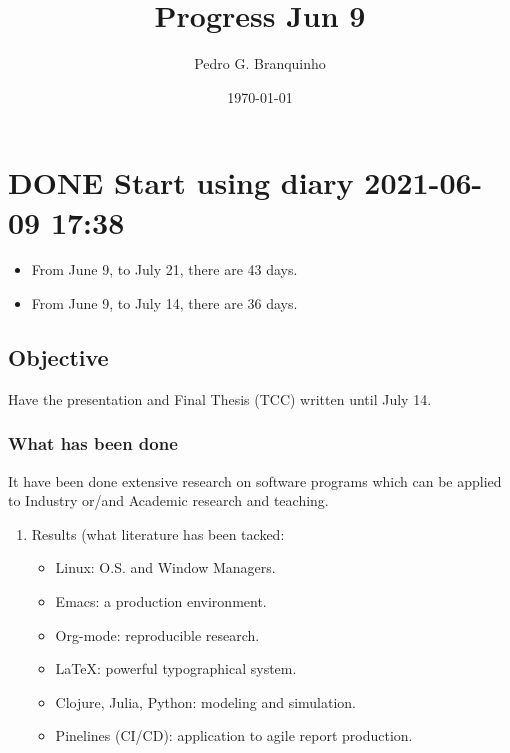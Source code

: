 \documentclass[11pt]{article}
\author{Pedro G. Branquinho}
\date{\today}
\title{Progress Jun 9}
\begin{document}
\maketitle
\tableofcontents


\section{{\bfseries\sffamily DONE} Start using diary 2021-06-09 17:38}
\label{sec:org8e48ef6}
\begin{itemize}
\item From June 9, to July 21, there are 43 days.
\item From June 9, to July 14, there are 36 days.
\end{itemize}

\subsection{Objective}
\label{sec:org8315f04}
Have the presentation and Final Thesis (TCC) written until July 14.

\subsubsection{What has been done}
\label{sec:org2d57880}
It have been done extensive research on software programs which
can be applied to Industry or/and Academic research and teaching.

\begin{enumerate}
\item Results (what literature has been tacked:
\label{sec:org463df83}
\begin{itemize}
\item Linux: O.S. and Window Managers.
\item Emacs: a production environment.
\item Org-mode: reproducible research.
\item \LaTeX{}: powerful typographical system.
\item Clojure, Julia, Python: modeling and simulation.
\item Pinelines (CI/CD): application to agile report production.
\end{itemize}
\end{enumerate}
\end{document}
